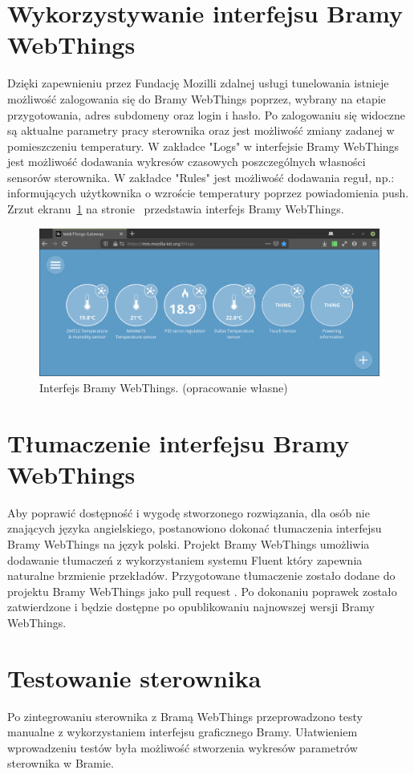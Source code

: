 \documentclass[11pt]{report}
\begin{document}
 \section{Wykorzystywanie interfejsu Bramy WebThings}
 Dzięki zapewnieniu przez Fundację Mozilli zdalnej usługi tunelowania istnieje możliwość zalogowania się do Bramy WebThings poprzez, wybrany na etapie przygotowania, adres subdomeny oraz login i hasło. Po zalogowaniu się widoczne są aktualne parametry pracy sterownika oraz jest możliwość zmiany zadanej w pomieszczeniu temperatury. W zakładce "Logs" w interfejsie Bramy WebThings jest możliwość dodawania wykresów czasowych poszczególnych własności sensorów sterownika. W zakładce "Rules" jest możliwość dodawania reguł, np.: informujących użytkownika o wzroście temperatury poprzez powiadomienia push.
  Zrzut ekranu~\ref{fig:gateway} na stronie~\pageref{fig:gateway} przedstawia interfejs Bramy WebThings.
\begin{figure}[ht]
\centering
\includegraphics[width=0.8 \textwidth]{fig/gateway.png}
\caption{Interfejs Bramy WebThings. (opracowanie własne)}
\label{fig:gateway}
\end{figure}
 
 \section{Tłumaczenie interfejsu Bramy WebThings}
 Aby poprawić dostępność i wygodę stworzonego rozwiązania, dla osób nie znających języka angielskiego, postanowiono dokonać tłumaczenia interfejsu Bramy WebThings na język polski. Projekt Bramy WebThings umożliwia dodawanie tłumaczeń z wykorzystaniem systemu Fluent \cite{fluent2020} który zapewnia naturalne brzmienie przekładów. Przygotowane tłumaczenie zostało dodane do projektu Bramy WebThings jako pull request \cite{gatewaypl2019}. Po dokonaniu poprawek zostało zatwierdzone i będzie dostępne po opublikowaniu najnowszej wersji Bramy WebThings.
 
  \section{Testowanie sterownika}
 Po zintegrowaniu sterownika z Bramą WebThings przeprowadzono testy manualne z wykorzystaniem interfejsu graficznego Bramy. Ułatwieniem wprowadzeniu testów była możliwość stworzenia wykresów parametrów sterownika w Bramie. 
 
\end{document}
